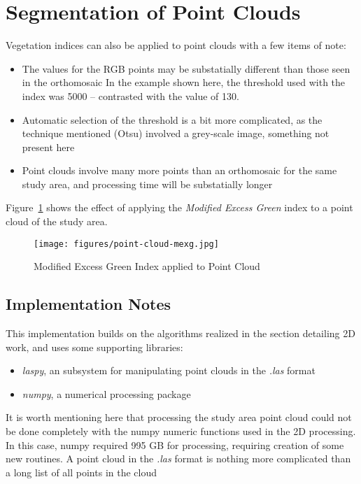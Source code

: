 \documentclass[letterpaper]{article}
\begin{document}
{%
%
\section{Segmentation of Point Clouds}
Vegetation indices can also be applied to point clouds with a few items of note:
\begin{itemize}
\item{The values for the RGB points may be substatially different than those seen in the orthomosaic In the example shown here, the threshold used with the index was 5000 -- contrasted with the value of 130.}
\item{Automatic selection of the threshold is a bit more complicated, as the technique mentioned (Otsu) involved a grey-scale image, something not present here}
\item{Point clouds involve many more points than an orthomosaic for the same study area, and processing time will be substatially longer}
\end{itemize}
Figure~\ref{fig:point-cloud-mexg} shows the effect of applying the {\it Modified Excess Green} index to a point cloud of the study area.

\begin{figure}[H]
\centering
  	\texttt{[image: figures/point-cloud-mexg.jpg]}
  	 \caption{Modified Excess Green Index applied to Point Cloud}
  	\label{fig:point-cloud-mexg}
\end{figure}

\subsection{Implementation Notes}
This implementation builds on the algorithms realized in the section detailing 2D work, and uses some supporting libraries:
\begin{itemize}
\item{{\it laspy}, an subsystem for manipulating point clouds in the {\it .las} format}
\item{{\it numpy}, a numerical processing package}
\end{itemize}

It is worth mentioning here that processing the study area point cloud could not be done completely with the numpy numeric functions used in the 2D processing. In this case, numpy required 995 GB for processing, requiring creation of some new routines. A point cloud in the {\it .las} format is nothing more complicated than a long list of all points in the cloud
%
%
}
\end{document}
